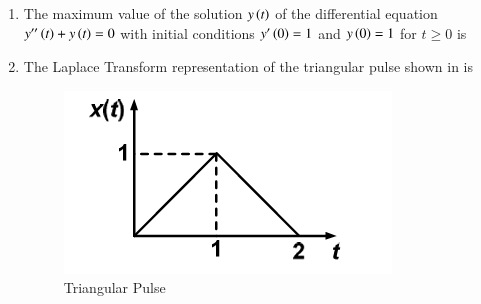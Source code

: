 \documentclass[journal,12pt,onecolumn]{IEEEtran}
\theoremstyle{remark}
\begin{document}
\begin{enumerate}
\item The maximum value of the solution $y\left(t\right)$ of the differential equation $y''\left(t\right) + y\left(t\right) = 0$ with initial conditions $y'\left(0\right) =1$ and $y\left(0\right) = 1$ for $t \ge 0$ is  
\par \hfill{}
\begin{enumerate}
\end{enumerate}

\item The Laplace Transform representation of the triangular pulse shown in  is \par \hfill{}
\begin{figure}[H]
    \centering
    \includegraphics[width=0.4\linewidth]{Figs/Q-38.png}
    \caption{Triangular Pulse}
    \label{38}
\end{figure}
\begin{enumerate}
\end{enumerate}


\end{enumerate}
\end{document}
